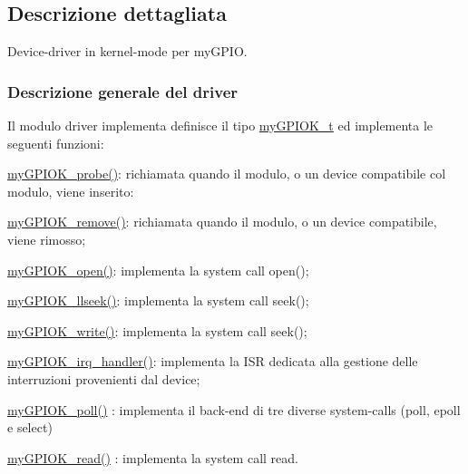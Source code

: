 \subsection{Descrizione dettagliata}
Device-\/driver in kernel-\/mode per my\+G\+P\+I\+O. 

\subsubsection*{Descrizione generale del driver}

Il modulo driver implementa definisce il tipo \hyperlink{structmy_g_p_i_o_k__t}{my\+G\+P\+I\+O\+K\+\_\+t} ed implementa le seguenti funzioni\+:
\begin{DoxyItemize}
\item \hyperlink{group___kernel-_module_gae40973a06d72f7c41a9af07513a62307}{my\+G\+P\+I\+O\+K\+\_\+probe()}\+: richiamata quando il modulo, o un device compatibile col modulo, viene inserito\+:
\item \hyperlink{group___kernel-_module_ga59fddfaa36dea357f4bbdfceb0f47f8c}{my\+G\+P\+I\+O\+K\+\_\+remove()}\+: richiamata quando il modulo, o un device compatibile, viene rimosso;
\item \hyperlink{group___kernel-_module_gad013759c18fbf6ea96005b9b3bfa5b4e}{my\+G\+P\+I\+O\+K\+\_\+open()}\+: implementa la system call open();
\item \hyperlink{group___kernel-_module_ga66e7f726b72320a272b633ecbaecefff}{my\+G\+P\+I\+O\+K\+\_\+llseek()}\+: implementa la system call seek();
\item \hyperlink{group___kernel-_module_ga1eea0f6c86e8966ba9b701da57502aad}{my\+G\+P\+I\+O\+K\+\_\+write()}\+: implementa la system call seek();
\item \hyperlink{group___kernel-_module_ga2fc230a12a97aa63e43b2dc4aec73511}{my\+G\+P\+I\+O\+K\+\_\+irq\+\_\+handler()}\+: implementa la I\+S\+R dedicata alla gestione delle interruzioni provenienti dal device;
\item \hyperlink{group___kernel-_module_gaba935e8a8215c2ebce9a7147fd4f5147}{my\+G\+P\+I\+O\+K\+\_\+poll()} \+: implementa il back-\/end di tre diverse system-\/calls (poll, epoll e select)
\item \hyperlink{group___kernel-_module_ga90ac339df9c02ae5f11a2a7727adc923}{my\+G\+P\+I\+O\+K\+\_\+read()} \+: implementa la system call read.
\end{DoxyItemize}

